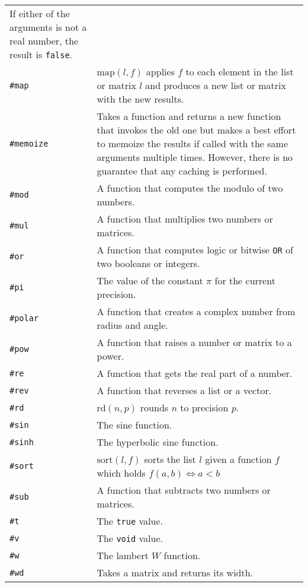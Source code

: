 \documentclass[10pt]{article}
\begin{document}
\begin{longtable}{p{}p{}}
                          If either of the arguments is not a real number, the result is \verb|false|. \\
        \verb|#map|     & $ \mathrm{map}(l,f) $ applies $ f $ to each element in the list or matrix  $ l $ and produces a new list or matrix with the new results. \\
        \verb|#memoize| & Takes a function and returns a new function that invokes the old one but makes a best effort to memoize the results if called with the same arguments multiple times.
                          However, there is no guarantee that any caching is performed. \\
        \verb|#mod|     & A function that computes the modulo of two numbers. \\
        \verb|#mul|     & A function that multiplies two numbers or matrices. \\
        \verb|#or|      & A function that computes logic or bitwise \verb|OR| of two booleans or integers. \\
        \verb|#pi|      & The value of the constant $ \pi $ for the current precision. \\
        \verb|#polar|   & A function that creates a complex number from radius and angle. \\
        \verb|#pow|     & A function that raises a number or matrix to a power. \\
        \verb|#re|      & A function that gets the real part of a number. \\
        \verb|#rev|     & A function that reverses a list or a vector. \\
        \verb|#rd |     & $ \mathrm{rd}(n,p) $ rounds $ n $ to precision $ p $. \\
        \verb|#sin|     & The sine function. \\
        \verb|#sinh|    & The hyperbolic sine function. \\
        \verb|#sort|    & $ \mathrm{sort}(l,f) $ sorts the list $ l $ given a function $ f $ which holds $ f(a,b) \iff a < b $ \\
        \verb|#sub|     & A function that subtracts two numbers or matrices. \\
        \verb|#t|       & The \verb|true| value. \\
        \verb|#v|       & The \verb|void| value. \\
        \verb|#w|       & The lambert $ W $ function. \\
        \verb|#wd|      & Takes a matrix and returns its width. \\

\end{longtable}
\end{document}
